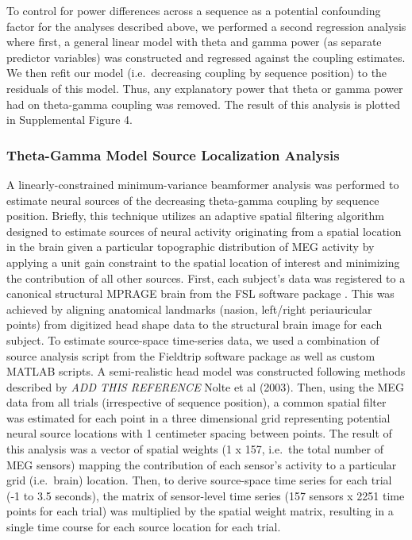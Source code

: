 To control for power differences across a sequence as a potential
confounding factor for the analyses described above, we performed a
second regression analysis where first, a general linear model with
theta and gamma power (as separate predictor variables) was constructed
and regressed against the coupling estimates. We then refit our model
(i.e.~decreasing coupling by sequence position) to the residuals of this
model. Thus, any explanatory power that theta or gamma power had on
theta-gamma coupling was removed. The result of this analysis is plotted
in Supplemental Figure 4.

\subsubsection{Theta-Gamma Model Source Localization
Analysis}\label{theta-gamma-model-source-localization-analysis}

A linearly-constrained minimum-variance beamformer analysis
\autocite{van_veen_localization_1997} was performed to estimate neural
sources of the decreasing theta-gamma coupling by sequence position.
Briefly, this technique utilizes an adaptive spatial filtering algorithm
designed to estimate sources of neural activity originating from a
spatial location in the brain given a particular topographic
distribution of MEG activity by applying a unit gain constraint to the
spatial location of interest and minimizing the contribution of all
other sources. First, each subject's data was registered to a canonical
structural MPRAGE brain from the FSL software package
\autocite{jenkinson_fsl_2012}. This was achieved by aligning anatomical
landmarks (nasion, left/right periauricular points) from digitized head
shape data to the structural brain image for each subject. To estimate
source-space time-series data, we used a combination of source analysis
script from the Fieldtrip software package as well as custom MATLAB
scripts. A semi-realistic head model was constructed following methods
described by \emph{ADD THIS REFERENCE} Nolte et al (2003). Then, using
the MEG data from all trials (irrespective of sequence position), a
common spatial filter was estimated for each point in a three
dimensional grid representing potential neural source locations with 1
centimeter spacing between points. The result of this analysis was a
vector of spatial weights (1 x 157, i.e.~the total number of MEG
sensors) mapping the contribution of each sensor's activity to a
particular grid (i.e.~brain) location. Then, to derive source-space time
series for each trial (-1 to 3.5 seconds), the matrix of sensor-level
time series (157 sensors x 2251 time points for each trial) was
multiplied by the spatial weight matrix, resulting in a single time
course for each source location for each trial.

